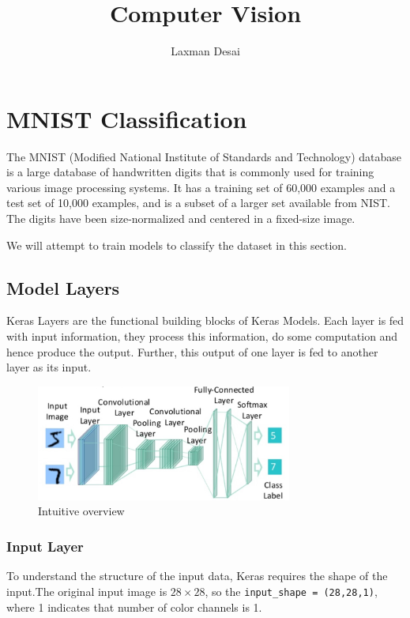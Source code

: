 \documentclass[12pt]{article}
\title{Computer Vision}
\author{Laxman Desai}
\theoremstyle{mytheoremstyle}
\theoremstyle{mytheoremstyle}
\theoremstyle{myproblemstyle}
\begin{document}
\maketitle
\tableofcontents

\pagebreak
\section{MNIST Classification}
  The MNIST (Modified National Institute of Standards and Technology) database is a large database of handwritten digits that is commonly used for training various image processing systems. It has a training set of 60,000 examples and a test set of 10,000 examples, and is a subset of a larger set available from NIST. The digits have been size-normalized and centered in a fixed-size image.
  
  We will attempt to train models to classify the dataset in this section.
  
  \subsection{Model Layers}
    Keras Layers are the functional building blocks of Keras Models. Each layer is fed with input information, they process this information, do some computation and hence produce the output. Further, this output of one layer is fed to another layer as its input.

    \begin{figure}[H]
      \centering
      \includegraphics[width=0.75\textwidth]{images/layers.jpeg}
      \caption{Intuitive overview}
    \end{figure}

    \subsubsection{Input Layer}
    To understand the structure of the input data, Keras requires the shape of the input.The original input image is $28 \times 28$, so the \texttt{input\_shape = (28,28,1)}, where 1 indicates that number of color channels is 1.
  
\end{document}
